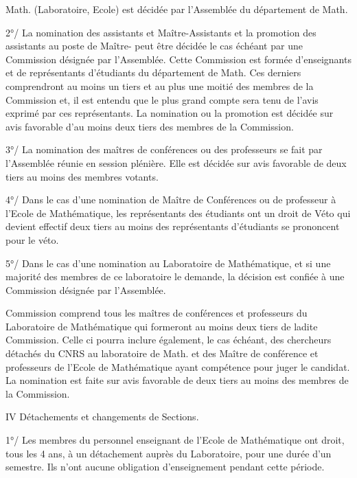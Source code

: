
Math. (Laboratoire, Ecole) est décidée par l'Assemblée du département de Math.

2°/ La nomination des assistants et Maître-Assistants et la promotion des assistants au poste de Maître- peut être décidée le cas échéant par une Commission désignée par l'Assemblée. Cette Commission est formée d'enseignants et de représentants d'étudiants du département de Math. Ces derniers comprendront au moins un tiers et au plus une moitié des membres de la Commission et, il est entendu que le plus grand compte sera tenu de l'avis exprimé par ces représentants. La nomination ou la promotion est décidée sur avis favorable d'au moins deux tiers des membres de la Commission.

3°/ La nomination des maîtres de conférences ou des professeurs se fait par l'Assemblée réunie en session plénière. Elle est décidée sur avis favorable de deux tiers au moins des membres votants.

4°/ Dans le cas d'une nomination de Maître de Conférences ou de professeur à l'Ecole de Mathématique, les représentants des étudiants ont un droit de Véto qui devient effectif  deux tiers au moins des représentants d'étudiants se prononcent pour le véto.

5°/ Dans le cas d'une nomination au Laboratoire de Mathématique, et si une majorité des membres de ce laboratoire le demande, la décision est confiée à une Commission désignée par l'Assemblée.


 Commission comprend tous les maîtres de conférences et professeurs du Laboratoire de Mathématique qui formeront au moins deux tiers de ladite Commission. Celle ci pourra inclure également, le cas échéant, des chercheurs détachés du CNRS au laboratoire de Math. et des Maître de conférence et professeurs de l'Ecole de Mathématique ayant compétence pour juger le candidat. La nomination est faite sur avis favorable de deux tiers au moins des membres de la Commission.

IV Détachements et changements de Sections.

1°/ Les membres du personnel enseignant de l'Ecole de Mathématique ont droit, tous les 4 ans, à un détachement auprès du Laboratoire, pour une durée d'un semestre. Ils n'ont aucune obligation d'enseignement pendant cette période.

